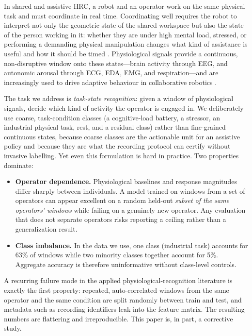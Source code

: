 \documentclass{llncs}
\begin{document}
In shared and assistive \ac{HRC}, a robot and an operator work on the same physical
task and must coordinate in real time. Coordinating well requires the robot to
interpret not only the geometric state of the shared workspace but also the state of
the person working in it: whether they are under high mental load, stressed, or
performing a demanding physical manipulation changes what kind of assistance is
useful and how it should be timed \cite{selvaggio2021autonomy}. Physiological
signals provide a continuous, non-disruptive window onto these states---brain
activity through \ac{EEG}, and autonomic arousal through \ac{ECG}, \ac{EDA},
\ac{EMG}, and respiration---and are increasingly used to drive adaptive behaviour in
collaborative robotics \cite{bussolan2024stressdetector,borghi2025operatorstress}.

The task we address is \emph{task-state recognition}: given a window of physiological
signals, decide which kind of activity the operator is engaged in. We deliberately
use coarse, task-condition classes (a cognitive-load battery, a stressor, an
industrial physical task, rest, and a residual class) rather than fine-grained
continuous states, because coarse classes are the actionable unit for an assistive
policy and because they are what the recording protocol can certify without invasive
labelling. Yet even this formulation is hard in practice. Two properties dominate:

\begin{itemize}
\item \textbf{Operator dependence.} Physiological baselines and response magnitudes
differ sharply between individuals. A model trained on windows from a set of
operators can appear excellent on a random held-out \emph{subset of the same
operators' windows} while failing on a genuinely new operator. Any evaluation that
does not separate operators risks reporting a ceiling rather than a generalization
result.
\item \textbf{Class imbalance.} In the data we use, one class (industrial task)
accounts for 63\% of windows while two minority classes together account for 5\%.
Aggregate accuracy is therefore uninformative without class-level controls.
\end{itemize}

A recurring failure mode in the applied physiological-recognition literature is
exactly the first property: repeated, auto-correlated windows from the same operator
and the same condition are split randomly between train and test, and metadata such
as recording identifiers leak into the feature matrix. The resulting numbers are
flattering and irreproducible. This paper is, in part, a corrective study.
\end{document}
